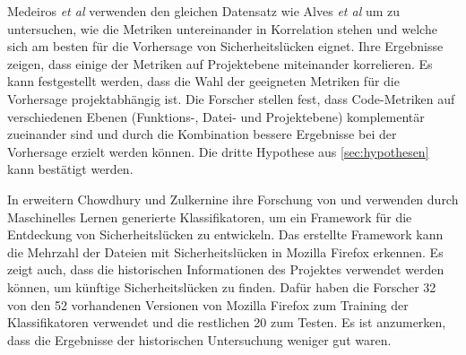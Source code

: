 Medeiros \emph{et al} \cite{medeiros_et_al} verwenden den gleichen Datensatz wie Alves \emph{et al} \cite{alves_et_al} um zu untersuchen, wie die Metriken untereinander in Korrelation stehen und welche sich am besten für die Vorhersage von Sicherheitslücken eignet.
Ihre Ergebnisse zeigen, dass einige der Metriken auf Projektebene miteinander korrelieren.
Es kann festgestellt werden, dass die Wahl der geeigneten Metriken für die Vorhersage projektabhängig ist.
Die Forscher stellen fest, dass Code-Metriken auf verschiedenen Ebenen (Funktions-, Datei- und Projektebene) komplementär zueinander sind und durch die Kombination bessere Ergebnisse bei der Vorhersage erzielt werden können.
Die dritte Hypothese aus \ref{sec:hypothesen} kann bestätigt werden.

In \cite{chowdhury_zulkernine_2009} erweitern Chowdhury und Zulkernine ihre Forschung von \cite{chowdhury_zulkernine_2010} und verwenden durch Maschinelles Lernen generierte Klassifikatoren, um ein Framework für die Entdeckung von Sicherheitslücken zu entwickeln.
Das erstellte Framework kann die Mehrzahl der Dateien mit Sicherheitslücken in Mozilla Firefox erkennen.
Es zeigt auch, dass die historischen Informationen des Projektes verwendet werden können, um künftige Sicherheitslücken zu finden.
Dafür haben die Forscher 32 von den 52 vorhandenen Versionen von Mozilla Firefox zum Training der Klassifikatoren verwendet und die restlichen 20 zum Testen.
Es ist anzumerken, dass die Ergebnisse der historischen Untersuchung weniger gut waren.
